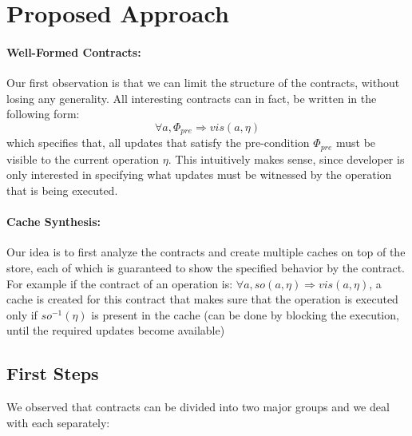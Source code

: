 \documentclass[runningheads]{llncs}
\begin{document}
\section{Proposed Approach}
\paragraph{\bf Well-Formed Contracts:}
Our first observation is that we can limit the structure of the contracts, without losing any generality. 
All interesting contracts can in fact, be written in the following form: 
\[\forall a, \Phi_{pre} \Rightarrow vis (a,\eta) \]
which specifies that, all updates that satisfy the pre-condition $\Phi_{pre}$ must be visible to the current operation $\eta$. This intuitively makes sense, since developer is only interested in specifying what updates must be witnessed by the operation that is being executed. 

\paragraph{\bf Cache Synthesis:} 
Our idea is to first analyze the contracts and create multiple caches on top of the store, each of which is guaranteed to show the specified behavior by the contract. For example if the contract of an operation is: \(\forall a, so(a,\eta) \Rightarrow vis(a,\eta)\), a cache is created for this contract that makes sure that the operation is executed only if $so^{-1}(\eta)$ is present in the cache (can be done by blocking the execution, until the required updates become available)
\subsection{First Steps}
We observed that contracts can be divided into two major groups and we deal with each separately: 
\end{document}
